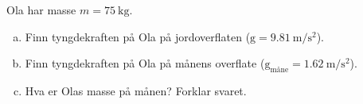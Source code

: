 %
Ola har masse $m = \SI{75}{\kilo\gram}$.
\begin{enumerate}[a)]
    \item Finn tyngdekraften på Ola på jordoverflaten ($\mathrm{g} = \SI{9.81}{\metre\per\second\squared}$).
    \item Finn tyngdekraften på Ola på månens overflate ($\mathrm{g}_\text{måne} = \SI{1.62}{\metre\per\second\squared}$).
    \item Hva er Olas masse på månen? Forklar svaret.
\end{enumerate}
